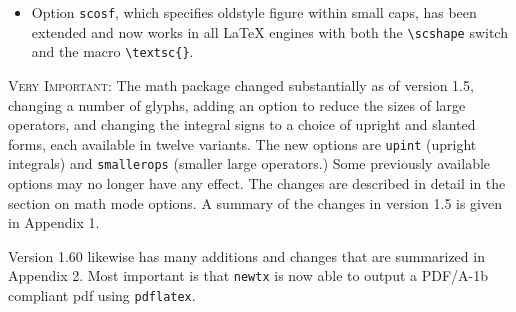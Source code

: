 \documentclass[\fsc]{article}
\theoremstyle{oldplain}
\theoremstyle{plain}
\begin{document}
\begin{itemize}
\item Option {\tt scosf}, which specifies oldstyle figure within small caps, has been extended and now works in all LaTeX engines with both the \verb|\scshape| switch and the macro \verb|\textsc{}|.
\end{itemize}
\textsc{Very Important:} The math package changed substantially as of version 1.5, changing a number of glyphs, adding an option to reduce the sizes of large operators, and changing the integral signs to a choice of upright and slanted forms, each available in twelve variants. The new options are {\tt upint} (upright integrals) and {\tt smallerops} (smaller large operators.) Some previously available options may no longer have any effect. The changes are described in detail in the section on math mode options. A summary of the changes in version 1.5 is given in  Appendix 1. 

Version 1.60 likewise has many additions and changes that are summarized in Appendix 2. Most important is that {\tt newtx} is now able to output a PDF/A-1b compliant pdf using {\tt pdflatex}.
\end{document}
